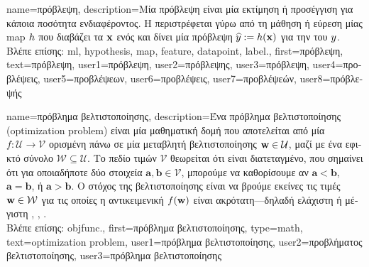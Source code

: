 {name={\foreignlanguage{greek}{πρόβλεψη}},
	description={\foreignlanguage{greek}{Μία πρόβλεψη} 
		\foreignlanguage{greek}{είναι μία εκτίμηση ή προσέγγιση για κάποια ποσότητα ενδιαφέροντος. Η} 
		 \foreignlanguage{greek}{περιστρέφεται γύρω από τη μάθηση ή εύρεση μίας} \gls{map}  $h$ 
		\foreignlanguage{greek}{που διαβάζει τα}  ${\bf x}$ \foreignlanguage{greek}{ενός}  
		\foreignlanguage{greek}{και δίνει μία πρόβλεψη $\widehat{y} := h({\bf x})$ για την}  
		\foreignlanguage{greek}{του} $y$.\\
		\foreignlanguage{greek}{Βλέπε επίσης:} \gls{ml}, \gls{hypothesis}, \gls{map}, \gls{feature}, \gls{datapoint}, \gls{label}.},
	first={\foreignlanguage{greek}{πρόβλεψη}},
	text={\foreignlanguage{greek}{πρό\-βλε\-ψη}},
	user1={\foreignlanguage{greek}{πρόβλεψη}}, %
  	user2={\foreignlanguage{greek}{πρόβλεψης}}, %
	user3={\foreignlanguage{greek}{πρόβλεψη}}, %
	user4={\foreignlanguage{greek}{προβλέψεις}}, %
	user5={\foreignlanguage{greek}{προβλέψεων}}, %
	user6={\foreignlanguage{greek}{προβλέψεις}}, %
	user7={\foreignlanguage{greek}{προβλέψεών}}, %
	user8={\foreignlanguage{greek}{πρόβλεψής}} %
}

{name={\foreignlanguage{greek}{πρόβλημα βελτιστοποίησης}}, 
	description={\foreignlanguage{greek}{Ένα πρόβλημα βελτιστοποίησης} 
		(optimization problem) \foreignlanguage{greek}{είναι μία μαθηματική δομή που αποτελείται από μία}  
		$f: \mathcal{U} \rightarrow \mathcal{V}$ \foreignlanguage{greek}{ορισμένη πάνω σε μία μεταβλητή βελτιστοποίησης 
		${\bf w} \in \mathcal{U}$, μαζί με ένα εφικτό σύνολο $\mathcal{W} \subseteq \mathcal{U}$. Το 
		πεδίο τιμών $\mathcal{V}$ θεωρείται ότι είναι διατεταγμένο, που σημαίνει ότι για οποιαδήποτε δύο στοιχεία 
		$\mathbf{a}, \mathbf{b} \in \mathcal{V}$, μπορούμε να καθορίσουμε αν $\mathbf{a} < \mathbf{b}$, $\mathbf{a} = \mathbf{b}$, 
		ή $\mathbf{a} > \mathbf{b}$. Ο στόχος της βελτιστοποίησης είναι να βρούμε εκείνες τις τιμές ${\bf w} \in \mathcal{W}$ 
		για τις οποίες η αντικειμενική $f({\bf w})$ είναι ακρότατη—δηλαδή ελάχιστη ή μέγιστη} 
		\cite{BertsekasNonLinProgr}, \cite{BoydConvexBook}, \cite{nesterov04}.\\
		\foreignlanguage{greek}{Βλέπε επίσης:} \gls{objfunc}.},
	first={\foreignlanguage{greek}{πρόβλημα βελτιστοποίησης}},
	type=math,
	text={optimization problem},
	user1={\foreignlanguage{greek}{πρόβλημα βελτιστοποίησης}}, %
  	user2={\foreignlanguage{greek}{προβλήματος βελτιστο\-ποί\-ησης}}, %
	user3={\foreignlanguage{greek}{πρόβλημα βελτιστοποίησης}} %
}

